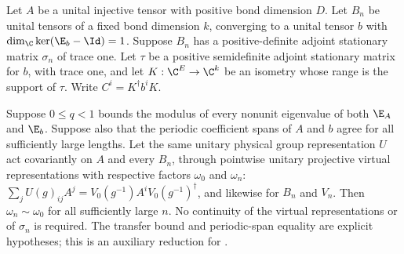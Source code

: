 \begin{lemma}
    \label{thm:spc_aux_convergent_unital_sequence_class}
    \leanok
    Let $A$ be a unital injective tensor with positive bond dimension $D$.
    Let $B_n$ be unital tensors of a fixed bond dimension $k$, converging to
    a unital tensor $b$ with $\dim_{\C}\ker(\E_b-\Id)=1$.
    Suppose $B_n$ has a positive-definite adjoint stationary matrix $\sigma_n$
    of trace one. Let $\tau$ be a positive semidefinite adjoint stationary
    matrix for $b$, with trace one, and let $K:\C^E\to\C^k$ be an isometry
    whose range is the support of $\tau$.
    Write $C^i=K^\dagger b^iK$.

    Suppose $0\leq q<1$ bounds the modulus of every nonunit eigenvalue of
    both $\E_A$ and $\E_b$. Suppose also that the periodic coefficient spans
    of $A$ and $b$ agree for all sufficiently large lengths.
    Let the same unitary physical group representation $U$ act covariantly
    on $A$ and every $B_n$, through pointwise unitary projective virtual
    representations with respective factors $\omega_0$ and $\omega_n$:
    $\sum_j U(g)_{ij}A^j=V_0(g^{-1})A^iV_0(g^{-1})^\dagger$, and likewise
    for $B_n$ and $V_n$.
    Then $\omega_n\sim\omega_0$ for all sufficiently large $n$.
    No continuity of the virtual representations or of $\sigma_n$ is required.
    The transfer bound and periodic-span equality are explicit hypotheses;
    this is an auxiliary reduction for
    \cite[Appendix~C, lines~2653--2717]{Schuch2011Phases}.
\end{lemma}
